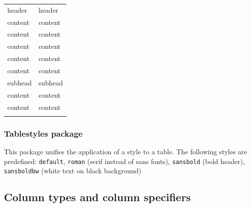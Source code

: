 \begin{filecontents*}{\democodefile}
\begin{table}[H]
%
\tablestyle[sansbold]
%
\begin{tabular}{*{2}{p{}}}
\theadstart
    \thead header &
    \thead header \\
\tbody
%
 content  & content \\
 content  & content \\
 content  & content \\
 content  & content \\
 content  & content \\
%
\tsubheadstart
 \tsubhead subhead &
 \tsubhead subhead \\
%
 content  & content \\
 content  & content \\
\tend
\end{tabular}
\end{table} 
\end{filecontents*}

\subsubsection{Tablestyles package}
\label{sec:tableStylePackage}

This package unifies the application of a style to a table. The following styles are predefined: \texttt{default}, \texttt{roman} (serif instead of sans fonts), \texttt{sansbold} (bold header), \texttt{sansboldbw} (white text on black background)

%



\subsection{Column types and column specifiers}
\label{sec:tableColumnTypes}

